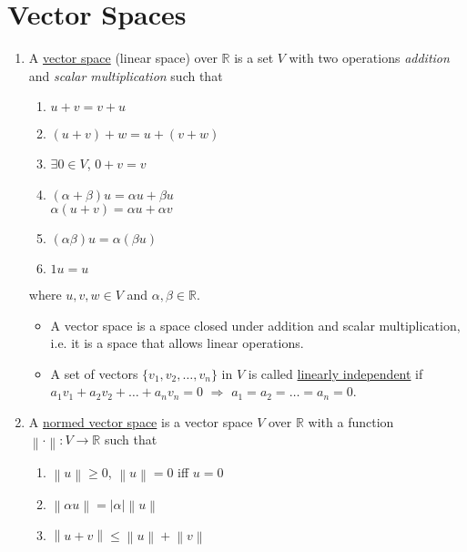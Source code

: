 \documentclass[%
 aip,
 jmp,%
 amsmath,amssymb,
 reprint,%
]{revtex4-1}
\def\R{{\mathbb R}}
\def\a{\alpha}
\def\b{\beta}
\newcommand{\norm}[1]{\left\lVert#1\right\rVert}
\newcommand{\imply}{\Rightarrow}
\newcommand{\defn}[1]{\underline{#1}}
\begin{document}
\section{Vector Spaces}
\begin{enumerate}
  \item A \defn{vector space} (linear space) over $\R$ is a set $V$
   with two operations \emph{addition} and \emph{scalar multiplication} such that
      \begin{enumerate}
        \item $u + v = v + u$
        \item $(u+v) + w = u + (v+w)$
        \item $\exists 0 \in V$, $0+v=v$
        \item $(\a + \b) u = \a  u + \b  u$ \\
              $\a  (u + v) = \a  u + \a  v $
        \item $(\a\b) u = \a (\b u)$
        \item $1 u = u$
      \end{enumerate}
      where $u,v,w \in V$ and $\a,\b \in \R$.

      \begin{itemize}
        \item {\footnotesize A vector space is a space closed under addition and
        scalar multiplication, i.e. it is a space that allows linear operations.}
        \item A set of vectors $\{v_1,v_2,\dots,v_n\}$ in $V$ is called \defn{linearly independent}
        if $a_1v_1 + a_2v_2 + \dots + a_nv_n =0$ $\imply$ $a_1=a_2=\dots=a_n=0$.

      \end{itemize}

  \item A \defn{normed vector space} is a vector space $V$ over $\R$ with a function
  $\norm{\cdot}: V \to \R$ such that
      \begin{enumerate}
        \item $\norm{u} \ge 0$, $\norm{u}=0$ iff $u=0$
        \item $\norm{\a u} = |\a| \norm{u}$
        \item $\norm{u+v} \le \norm{u} + \norm{v}$
      \end{enumerate}


\end{enumerate}
\end{document}
